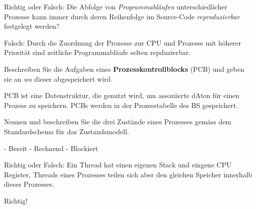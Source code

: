 \documentclass{article}
\begin{document}
\begin{tcolorbox}[colback=white!10!white,colframe=lightgray!75!black,
  savelowerto=\jobname_ex.tex,breakable,enhanced,lines before break=40]

\begin{center}
Richtig oder Falsch: Die Abfolge von 
\textit{Programmabläufen
} unterschiedlicher Prozesse kann immer durch deren Reihenfolge im Source-Code 
\textit{reproduzierbar
} festgelegt werden?

\end{center}

\tcblower

\justifying
Falsch: Durch die Zuordnung der Prozesse zur CPU und Prozesse mit höherer Priorität sind zeitliche Programmabläufe selten repduzierbar.

\end{tcolorbox}
\begin{tcolorbox}[colback=white!10!white,colframe=lightgray!75!black,
  savelowerto=\jobname_ex.tex,breakable,enhanced,lines before break=40]

\begin{center}
Beschreiben Sie die Aufgaben eines 
\textbf{Prozesskontrollblocks
} (PCB) und geben sie an 
\textit{wo
} dieser abgespeichert wird.

\end{center}

\tcblower

\justifying
PCB ist eine Datenstruktur, die genutzt wird, um assoziierte dAten für einen Prozess zu speichern.
PCBs werden in der Prozesstabelle des BS gespeichert.

\end{tcolorbox}
\begin{tcolorbox}[colback=white!10!white,colframe=lightgray!75!black,
  savelowerto=\jobname_ex.tex,breakable,enhanced,lines before break=40]

\begin{center}
Nennen und beschreiben Sie die drei Zustände eines Prozesses gemäss dem Standardschema für das Zustandsmodell.

\end{center}

\tcblower

\justifying
- Bereit
- Rechnend
- Blockiert

\end{tcolorbox}
\begin{tcolorbox}[colback=white!10!white,colframe=lightgray!75!black,
  savelowerto=\jobname_ex.tex,breakable,enhanced,lines before break=40]

\begin{center}
Richtig oder Falsch: Ein Thread hat einen eigenen Stack und eingene CPU Register, Threads eines Prozesses teilen sich aber den gleichen Speicher innerhalb dieses Prozesses.

\end{center}

\tcblower

\justifying
Richtig!

\end{tcolorbox}
\end{document}

